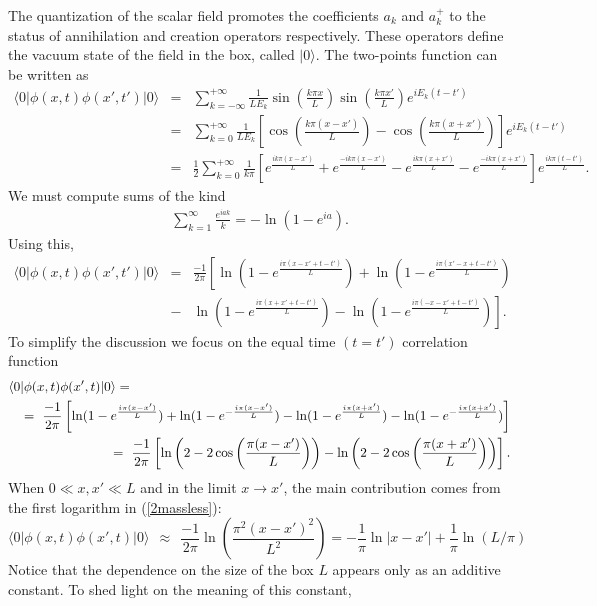 \documentclass[10pt, nofootinbib]{revtex4}
\newcommand{\be}{\begin{equation}}
\newcommand{\ee}{\end{equation}}
\newcommand{\bea}{\begin{eqnarray}}
\newcommand{\eea}{\end{eqnarray}}
\begin{document}
The quantization of the scalar field promotes the coefficients $a_k$
and $a_k^+$ to the status of annihilation and creation operators
respectively.  These operators define the vacuum state of the field in
the box, called $| 0 \rangle $.  The two-points function can be
written as
%
\bea \langle 0 | \phi(x,t) \phi(x',t') | 0 \rangle &=&
\sum_{k=-\infty}^{+\infty}\frac{1}{{L E_k}} \sin \left( \frac{k \pi
x}{L} \right) \sin \left( \frac{k \pi x'}{L} \right) e^{i E_k (t-t')}
\\
&=& \sum_{k=0}^{+\infty}\frac{1}{{L E_k}} \left[ \cos \left( \frac{k
\pi (x-x')}{L} \right) - \cos \left( \frac{k \pi (x+x')}{L} \right)
\right] e^{i E_k (t-t')} \nonumber\\
&=& \frac{1}{2} \sum_{k=0}^{+\infty}\frac{1}{{k \pi}} \left[ e^{
\frac{ik \pi (x-x')}{L} }+e^{ \frac{-ik \pi (x-x')}{L} } - e^{
\frac{ik \pi (x+x')}{L} }- e^{ \frac{-ik \pi (x+x')}{L} } \right]
e^{\frac{ik \pi (t-t')}{L} }. \nonumber \eea
%
We must compute sums of the kind
%
\bea \sum_{k=1}^{\infty} \frac{e^{iak}}{k} = -\ln (1-{e^{ia}}). 
\eea
%
Using this,
%
\bea \langle 0 | \phi(x,t) \phi(x',t') | 0 \rangle &=& \frac{-1}{2
\pi} \left[ \ln (1-{e^{\frac{i\pi(x-x'+t-t') }{L}}})+\ln
(1-{e^{\frac{i\pi(x'-x+t-t') }{L}}}) \right.  \nonumber\\
&-& \left.  \ln (1-{e^{\frac{i\pi(x+x'+t-t') }{L}}})-\ln
(1-{e^{\frac{i\pi(-x-x'+t-t') }{L}}}) \right].
\eea
%
To simplify the discussion we focus on the
equal time $(t=t')$ correlation function
%
\bea \langle 0 | \phi(x,t) \phi(x',t) | 0 \rangle &=& \nonumber \\ 
&&\hspace{-9em} = \ \frac{-1}{2
\pi} \left[ \ln (1-{e^{\frac{i\pi(x-x') }{L}}})+\ln
(1-{e^{-\frac{i\pi(x-x') }{L}}}) - \ln (1-{e^{\frac{i\pi(x+x')
}{L}}})-\ln (1-{e^{-\frac{i\pi(x+x') }{L}}}) \right] \nonumber\\
&&\hspace{-9em} =\ 
\frac{-1}{2 \pi} \left[ \ln \left(2-2 \cos \left( \frac{\pi
(x-x')}{L}\right) \right) - \ln \left(2-2 \cos \left( \frac{\pi
(x+x')}{L}\right)\right) \right].
\label{2massless}
\eea
%
When $0 \ll x,x' \ll L$ and in the limit $x \rightarrow x'$, the main
contribution comes from the first logarithm in (\ref{2massless}):
%
\be \langle 0 | \phi(x,t) \phi(x',t) | 0 \rangle \ \ \approx\ \ 
\frac{-1}{2 \pi} \ln \left({{\frac{\pi^2(x-x')^2 }{L^2}}} \right)
=
-\frac{1}{\pi} \ln|x-x'| + \frac{1}{\pi} \ln (L/\pi) 
\label{limit2massless}
\ee
%
Notice that the dependence on the size of the box $L$ appears only as
an additive constant.  To shed light on the meaning of this constant,
\end{document}
